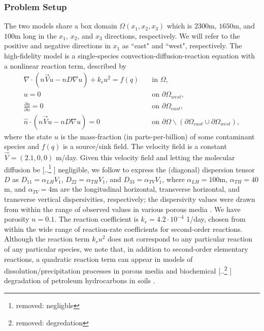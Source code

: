 \documentclass[review]{siamart0516}
\providecommand{\DIFaddtex}[1]{{\protect\color{blue} \sf #1}} %
\providecommand{\DIFdeltex}[1]{{\protect\color{red} [..\footnote{removed: #1} ]}} %
\providecommand{\DIFaddbegin}{} %
\providecommand{\DIFaddend}{} %
\providecommand{\DIFdelbegin}{} %
\providecommand{\DIFdelend}{} %
\providecommand{\DIFadd}[1]{\texorpdfstring{\DIFaddtex{#1}}{#1}} %
\providecommand{\DIFdel}[1]{\texorpdfstring{\DIFdeltex{#1}}{}} %
\newcommand{\DIFscaledelfig}{0.5}
\newlength{\DIFdelgraphicswidth} %
\newlength{\DIFdelgraphicsheight} %
\newcommand{\DIFaddincludegraphics}[2][]{{\color{blue}\fbox{\DIFOincludegraphics[#1]{#2}}}} %
\newcommand{\DIFdelincludegraphics}[2][]{%
\sbox{\DIFdelgraphicsbox}{\DIFOincludegraphics[#1]{#2}}%
\settoboxwidth{\DIFdelgraphicswidth}{\DIFdelgraphicsbox} %
\settoboxtotalheight{\DIFdelgraphicsheight}{\DIFdelgraphicsbox} %
\scalebox{\DIFscaledelfig}{%
\parbox[b]{\DIFdelgraphicswidth}{\usebox{\DIFdelgraphicsbox}\\[-\baselineskip] \rule{\DIFdelgraphicswidth}{0em}}\llap{\resizebox{\DIFdelgraphicswidth}{\DIFdelgraphicsheight}{%
\setlength{\unitlength}{\DIFdelgraphicswidth}%
\begin{picture}(1,1)%
\thicklines\linethickness{2pt} %
{\color[rgb]{1,0,0}\put(0,0){\framebox(1,1){}}}%
{\color[rgb]{1,0,0}\put(0,0){\line( 1,1){1}}}%
{\color[rgb]{1,0,0}\put(0,1){\line(1,-1){1}}}%
\end{picture}%
}\hspace*{3pt}}} %
} %
\DeclareRobustCommand{\DIFaddbegin}{\DIFOaddbegin \let\includegraphics\DIFaddincludegraphics} %
\DeclareRobustCommand{\DIFaddend}{\DIFOaddend \let\includegraphics\DIFOincludegraphics} %
\DeclareRobustCommand{\DIFdelbegin}{\DIFOdelbegin \let\includegraphics\DIFdelincludegraphics} %
\DeclareRobustCommand{\DIFdelend}{\DIFOaddend \let\includegraphics\DIFOincludegraphics} %
\begin{document}
\subsubsection{Problem Setup} \label{sec:setup3D_diffmesh}

The two models share a box domain $\Omega(x_1,x_2,x_3)$ which is $2300$m, $1650$m, and $100$m long in the $x_1$, $x_2$, and $x_3$ directions, respectively. We will refer to the positive and negative directions in $x_1$ as ``east" and ``west", respectively. The high-fidelity model is a single-species convection-diffusion-reaction equation with a nonlinear reaction term, described by
%
\begin{subequations}
\label{eq:cdvcdrHF3D}
\begin{align}
\nabla\cdot(n\vec{V}u - nD\nabla u) + k_ru^2 = f(q) \quad &\text{in } \Omega, \label{eq:HFeq3D}\\
u = 0 \quad &\text{on } \partial \Omega_{west}, \\
\frac{\partial u}{\partial n} = 0 \quad &\text{on }\partial\Omega_{east}, \\
\hat{n}\cdot(n\vec{V}u - nD\nabla u) = 0 \quad &\text{on }\partial\Omega\backslash(\partial\Omega_{east}\cup\partial\Omega_{west}),
\end{align}
\end{subequations}
%
where the state $u$ is the mass-fraction (in parts-per-billion) of some contaminant species and $f(q)$ is a source/sink field. The velocity field is a constant $\vec{V}=(2.1,0,0)$ m/day. Given this velocity field and letting the molecular diffusion be \DIFdelbegin \DIFdel{negligble}\DIFdelend \DIFaddbegin \DIFadd{negligible}\DIFaddend , we follow \cite{Vestedetal93} to express the (diagonal) dispersion tensor $D$ as $D_{11}=\alpha_{LH}V_1$, $D_{22}=\alpha_{TH}V_1$, and $D_{33}=\alpha_{TV}V_1$, where $\alpha_{LH}=100$m, $\alpha_{TH}=40$m, and $\alpha_{TV}=4$m are the longitudinal horizontal, transverse horizontal, and transverse vertical dispersivities, respectively; the dispersivity values were drawn from within the range of observed values in various porous media \cite{Davis86}. We have porosity $n=0.1$. The reaction coefficient is $k_r=4.2\cdot10^{-4}$ 1/day, chosen from within the wide range of reaction-rate coefficients for second-order reactions. Although the reaction term $k_ru^2$ does not correspond to any particular reaction of any particular species, we note that, in addition to second-order elementary reactions, a quadratic reaction term can appear in models of dissolution/precipitation processes in porous media \cite{Aha97} and biochemical \DIFdelbegin \DIFdel{degredation }\DIFdelend \DIFaddbegin \DIFadd{degradation }\DIFaddend of petroleum hydrocarbons in soils \cite{Jack94}.
\end{document}
